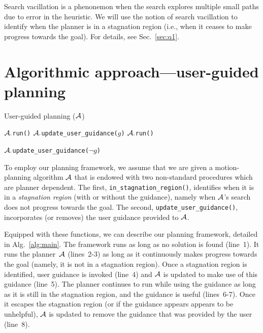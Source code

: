 \documentclass{article}
\begin{document}
Search vacillation is a phenonemon when the search explores multiple small paths due to error in the heuristic. 
We will use the notion of search vacillation to identify when the planner is in a stagnation region (i.e., when it ceases to make progress towards the goal). For details, see Sec.~\ref{sec:q1}.



\section{Algorithmic approach---user-guided planning}
\label{sec:high}

\algrenewcommand\algorithmicindent{.8em}
\begin{algorithm}[tb]
\caption{User-guided planning ($\mathcal{A}$)}
\label{alg:main}	
\begin{algorithmic}[1]
\small
{} 
		\State $\mathcal{A}.$\texttt{run()}
	\EndWhile
%	
	\State $\mathcal{A}.$\texttt{update\_user\_guidance($g$)}
		\State $\mathcal{A}.$\texttt{run()}
	\EndWhile

	\State $\mathcal{A}.$\texttt{update\_user\_guidance($\neg g$)}
\EndWhile

\end{algorithmic}
\end{algorithm}



To employ our planning framework, we assume that we are given a motion-planning algorithm $\mathcal{A}$ that is endowed with two non-standard procedures which are planner dependent.
The first, \texttt{in\_stagnation\_region()}, 
identifies when it is in a \emph{stagnation region} (with or without the guidance), namely when $\mathcal{A}$'s search does not progress towards the goal. 
The second, \texttt{update\_user\_guidance()}, 
incorporates (or removes) the user guidance provided to $\mathcal{A}$. 

Equipped with these functions, we can describe our planning framework, detailed in Alg.~\ref{alg:main}.
The framework runs as long as no solution is found (line~1).
It runs the planner~$\mathcal{A}$ (lines~2-3) as long as it continuously makes progress towards the goal (namely, it is not in a stagnation region).
Once a stagnation region is identified, user guidance is invoked (line~4) and $\mathcal{A}$  is updated to make use of this guidance (line~5).
The planner continues to run while using the guidance as long as 
it is still in the stagnation region, and the guidance is useful (lines~6-7).
Once it escapes the stagnation region (or if the guidance appears appears to be unhelpful), $\mathcal{A}$ is updated to remove the guidance that was provided by the user (line~8).
\end{document}

